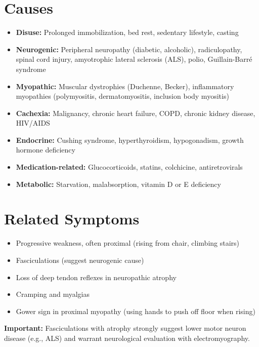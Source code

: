 \section*{Causes}
\begin{itemize}
  \item \textbf{Disuse:} Prolonged immobilization, bed rest, sedentary lifestyle, casting
  \item \textbf{Neurogenic:} Peripheral neuropathy (diabetic, alcoholic), radiculopathy, spinal cord injury, amyotrophic lateral sclerosis (ALS), polio, Guillain-Barr\'{e} syndrome
  \item \textbf{Myopathic:} Muscular dystrophies (Duchenne, Becker), inflammatory myopathies (polymyositis, dermatomyositis, inclusion body myositis)
  \item \textbf{Cachexia:} Malignancy, chronic heart failure, COPD, chronic kidney disease, HIV/AIDS
  \item \textbf{Endocrine:} Cushing syndrome, hyperthyroidism, hypogonadism, growth hormone deficiency
  \item \textbf{Medication-related:} Glucocorticoids, statins, colchicine, antiretrovirals
  \item \textbf{Metabolic:} Starvation, malabsorption, vitamin D or E deficiency
\end{itemize}

\section*{Related Symptoms}
\begin{itemize}
  \item Progressive weakness, often proximal (rising from chair, climbing stairs)
  \item Fasciculations (suggest neurogenic cause)
  \item Loss of deep tendon reflexes in neuropathic atrophy
  \item Cramping and myalgias
  \item Gower sign in proximal myopathy (using hands to push off floor when rising)
\end{itemize}
\textbf{Important:} Fasciculations with atrophy strongly suggest lower motor neuron disease (e.g., ALS) and warrant neurological evaluation with electromyography.

